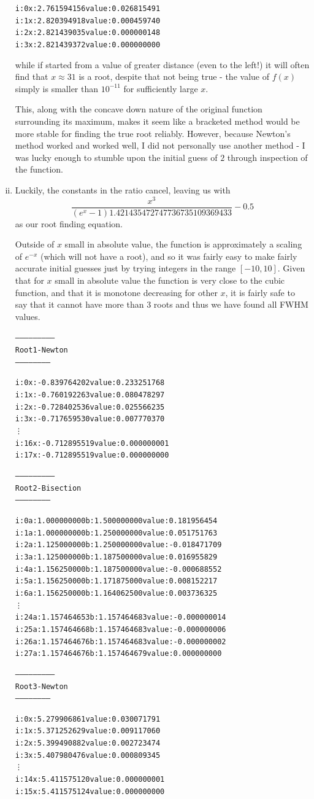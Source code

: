 \documentclass[11pt]{article} %
\begin{document}
\begin{enumerate}[i.)]
\begin{alltt}
i: 0	x: 2.761594156	value: 0.026815491
i: 1	x: 2.820394918	value: 0.000459740
i: 2	x: 2.821439035	value: 0.000000148
i: 3	x: 2.821439372	value: 0.000000000
\end{alltt}
while if started from a value of greater distance (even to the left!) it will often find that $x \approx 31$ is a root, despite that not being true - the value of $f(x)$ simply is smaller than $10^{-11}$ for sufficiently large $x$.
\par This, along with the concave down nature of the original function surrounding its maximum, makes it seem like a bracketed method would be more stable for finding the true root reliably. However, because Newton's method worked and worked well, I did not personally use another method - I was lucky enough to stumble upon the initial guess of $2$ through inspection of the function.
\item 
Luckily, the constants in the ratio cancel, leaving us with $$\frac{x^3}{(e^x-1)1.421435472747736735109369433}-0.5$$
 as our root finding equation.
\par Outside of $x$  small in absolute value, the function is approximately a scaling of $e^{-x}$ (which will not have a root), and so it was fairly easy to make fairly accurate initial guesses just by trying integers in the range $[-10,10]$. Given that for $x$ small in absolute value the function is very close to the cubic function, and that it is monotone decreasing for other $x$, it is fairly safe to say that it cannot have more than 3 roots and thus we have found all FWHM values.
\begin{alltt}
--------------------------
 Root 1 - Newton
 -----------------------


i: 0	x: -0.839764202	value: 0.233251768
i: 1	x: -0.760192263	value: 0.080478297
i: 2	x: -0.728402536	value: 0.025566235
i: 3	x: -0.717659530	value: 0.007770370
  \vdots
i: 16	x: -0.712895519	value: 0.000000001
i: 17	x: -0.712895519	value: 0.000000000


--------------------------
 Root 2 - Bisection
 -----------------------


i: 0	a: 1.000000000	b: 1.500000000	value: 0.181956454 
i: 1	a: 1.000000000	b: 1.250000000	value: 0.051751763 
i: 2	a: 1.125000000	b: 1.250000000	value: -0.018471709 
i: 3	a: 1.125000000	b: 1.187500000	value: 0.016955829 
i: 4	a: 1.156250000	b: 1.187500000	value: -0.000688552 
i: 5	a: 1.156250000	b: 1.171875000	value: 0.008152217 
i: 6	a: 1.156250000	b: 1.164062500	value: 0.003736325 
  \vdots
i: 24	a: 1.157464653	b: 1.157464683	value: -0.000000014 
i: 25	a: 1.157464668	b: 1.157464683	value: -0.000000006 
i: 26	a: 1.157464676	b: 1.157464683	value: -0.000000002 
i: 27	a: 1.157464676	b: 1.157464679	value: 0.000000000 


--------------------------
 Root 3 - Newton
 -----------------------


i: 0	x: 5.279906861	value: 0.030071791
i: 1	x: 5.371252629	value: 0.009117060
i: 2	x: 5.399490882	value: 0.002723474
i: 3	x: 5.407980476	value: 0.000809345
  \vdots
i: 14	x: 5.411575120	value: 0.000000001
i: 15	x: 5.411575124	value: 0.000000000
\end{alltt}
\end{enumerate}
\end{document}
